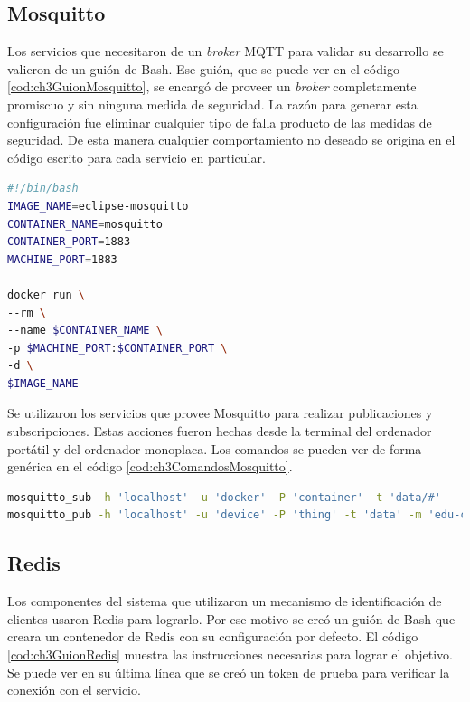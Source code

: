 \subsection{Mosquitto}

Los servicios que necesitaron de un \emph{broker} MQTT para validar su desarrollo se valieron de un guión de Bash.
Ese guión, que se puede ver en el código \ref{cod:ch3GuionMosquitto}, se encargó de proveer un \emph{broker} completamente promiscuo y sin ninguna medida de seguridad.
La razón para generar esta configuración fue eliminar cualquier tipo de falla producto de las medidas de seguridad.
De esta manera cualquier comportamiento no deseado se origina en el código escrito para cada servicio en particular.

\begin{lstlisting}[language=bash,label=cod:ch3GuionMosquitto,caption=Guión de Mosquitto.]
#!/bin/bash
IMAGE_NAME=eclipse-mosquitto
CONTAINER_NAME=mosquitto
CONTAINER_PORT=1883
MACHINE_PORT=1883

docker run \
--rm \
--name $CONTAINER_NAME \
-p $MACHINE_PORT:$CONTAINER_PORT \
-d \
$IMAGE_NAME
\end{lstlisting}

Se utilizaron los servicios que provee Mosquitto para realizar publicaciones y subscripciones.
Estas acciones fueron hechas desde la terminal del ordenador portátil y del ordenador monoplaca.
Los comandos se pueden ver de forma genérica en el código \ref{cod:ch3ComandosMosquitto}.

\begin{lstlisting}[language=bash,label=cod:ch3ComandosMosquitto,caption=Comandos de Mosquitto.]
mosquitto_sub -h 'localhost' -u 'docker' -P 'container' -t 'data/#'
mosquitto_pub -h 'localhost' -u 'device' -P 'thing' -t 'data' -m 'edu-ciaa,25'
\end{lstlisting}

\subsection{Redis}

Los componentes del sistema que utilizaron un mecanismo de identificación de clientes usaron Redis para lograrlo.
Por ese motivo se creó un guión de Bash que creara un contenedor de Redis con su configuración por defecto.
El código \ref{cod:ch3GuionRedis} muestra las instrucciones necesarias para lograr el objetivo.
Se puede ver en su última línea que se creó un token de prueba para verificar la conexión con el servicio.

